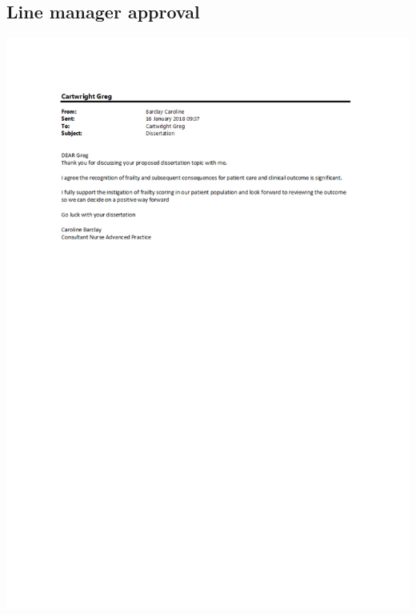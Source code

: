 \documentclass
[
	12pt,
	a4paper,
	oneside,
]{article}
\begin{document}
\begin{appendix}
\section{Line manager approval}
\label{appendix:caroline}
\includegraphics[width=\textwidth]{caroline.pdf}


\end{appendix}
\end{document}
